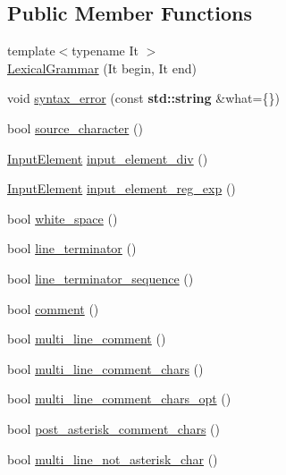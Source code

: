\subsection*{Public Member Functions}
\begin{DoxyCompactItemize}
\item 
{\footnotesize template$<$typename It $>$ }\\\hyperlink{class_lexical_grammar_ae00a07b2f2c282a59d8df82c0596cc04}{Lexical\+Grammar} (It begin, It end)
\item 
void \hyperlink{class_lexical_grammar_a939edcfd509e8c3814f0c704822ad61a}{syntax\+\_\+error} (const \textbf{ std\+::string} \&what=\{\})
\item 
bool \hyperlink{class_lexical_grammar_ad3f57a97b726239f8561556e2c920c09}{source\+\_\+character} ()
\item 
\hyperlink{class_input_element}{Input\+Element} \hyperlink{class_lexical_grammar_a6cb2dc7fbf0b773eb285bd70228abfd5}{input\+\_\+element\+\_\+div} ()
\item 
\hyperlink{class_input_element}{Input\+Element} \hyperlink{class_lexical_grammar_a9bb05f07c0d3941f11ac37d69e1e14fc}{input\+\_\+element\+\_\+reg\+\_\+exp} ()
\item 
bool \hyperlink{class_lexical_grammar_aa8d7fdc84e7ca55c85c67b2849e89ac2}{white\+\_\+space} ()
\item 
bool \hyperlink{class_lexical_grammar_ab0cbd5b59a7478d0f1042774b877714d}{line\+\_\+terminator} ()
\item 
bool \hyperlink{class_lexical_grammar_a43737fd87e454c3a426c047b02f376f6}{line\+\_\+terminator\+\_\+sequence} ()
\item 
bool \hyperlink{class_lexical_grammar_a342d05c7d8f59d5a4d0c7eb34fd97b3f}{comment} ()
\item 
bool \hyperlink{class_lexical_grammar_a9a4018bef475f8831e825ccc199a0baa}{multi\+\_\+line\+\_\+comment} ()
\item 
bool \hyperlink{class_lexical_grammar_a4f847dd31fc9ea84af23f03a7cf507eb}{multi\+\_\+line\+\_\+comment\+\_\+chars} ()
\item 
bool \hyperlink{class_lexical_grammar_aaf2e8e31825d9094dbd3c6f685448e14}{multi\+\_\+line\+\_\+comment\+\_\+chars\+\_\+opt} ()
\item 
bool \hyperlink{class_lexical_grammar_a87186e7112da8a1bd4abeb3edc07ff51}{post\+\_\+asterisk\+\_\+comment\+\_\+chars} ()
\item 
bool \hyperlink{class_lexical_grammar_a1f81a1a8b21254111cf4432bfbd17e15}{multi\+\_\+line\+\_\+not\+\_\+asterisk\+\_\+char} ()

\end{DoxyCompactItemize}
